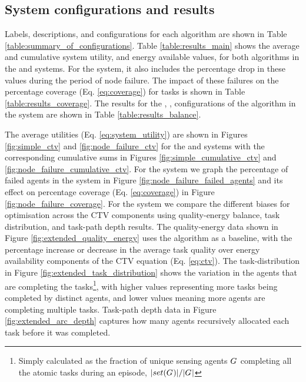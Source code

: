 \subsection{System configurations and results}
Labels, descriptions, and configurations for each algorithm are shown in Table \ref{table:summary_of_configurations}. Table \ref{table:results_main} shows the average and cumulative system utility, and energy available values, for both algorithms in the \simulationSimple{}{} and  \simulationNodeFailure{}{} systems. For the \simulationNodeFailure{}{} system, it also includes the percentage drop in these values during the period of node failure. The impact of these failures on the percentage coverage (Eq. \ref{eq:coverage}) for tasks is shown in Table \ref{table:results_coverage}. The results for the \algorithmEnergy{}{}, \algorithmQuality{}{}, \algorithmDistribution{}{} configurations of the \acronymWSNOptimisation{}{} algorithm in the \simulationExtended{}{} system are shown in Table \ref{table:results_balance}. 

The average utilities  (Eq. \ref{eq:system_utility}) are shown in Figures \ref{fig:simple_ctv} and \ref{fig:node_failure_ctv} for the \simulationSimple{}{} and \simulationNodeFailure{}{} systems with the corresponding cumulative sums in Figures \ref{fig:simple_cumulative_ctv} and \ref{fig:node_failure_cumulative_ctv}. For the \simulationNodeFailure{}{} system we graph the percentage of failed agents in the system in Figure \ref{fig:node_failure_failed_agents} and its effect on percentage coverage (Eq. \ref{eq:coverage}) in Figure \ref{fig:node_failure_coverage}.  For the \simulationExtended{}{} system we compare the different biases for optimisation across the CTV components using quality-energy balance, task distribution, and task-path depth results. The quality-energy data shown in Figure \ref{fig:extended_quality_energy} uses the \algorithmEnergy{}{} algorithm as a baseline, with the percentage increase or decrease in the average task quality over energy availability components of the CTV equation (Eq. \ref{eq:ctv}). The task-distribution in Figure \ref{fig:extended_task_distribution} shows the variation in the agents that are completing the tasks\footnote{ Simply calculated as the fraction of unique sensing agents $G_{}^{}$ completing all the atomic tasks during an episode, $\lvert set(G_{}^{}) \rvert{}/\lvert G_{}^{} \rvert{}$}, with higher values representing more tasks being completed by distinct agents, and lower values meaning more agents are completing multiple tasks. Task-path depth data in Figure \ref{fig:extended_arc_depth} captures how many agents recursively allocated each task before it was completed.